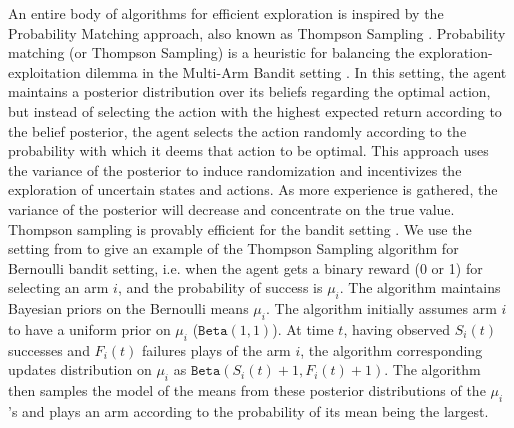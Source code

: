 \label{sec:thompson}
An entire body of algorithms for efficient exploration is inspired by the Probability Matching approach, also known as Thompson Sampling .
Probability matching (or Thompson Sampling)  is a heuristic for balancing the  exploration-exploitation dilemma in the Multi-Arm Bandit setting . In this setting, the agent maintains a posterior distribution over its beliefs regarding the optimal action, but instead of selecting the action with the highest expected return according to the belief posterior, the agent selects the action randomly according to the probability with which it deems that action to be optimal. This approach uses the variance of the posterior to induce randomization and incentivizes the exploration of uncertain states and actions. As more experience is gathered, the variance of the posterior will decrease and concentrate on the true value. Thompson sampling is provably efficient for the bandit setting .
We use the setting from  to give an example of the Thompson Sampling algorithm for Bernoulli bandit setting, i.e. when the agent gets a binary reward (0 or 1) for selecting an arm $i$, and the probability of success is $\mu_i$. The algorithm maintains Bayesian priors on the Bernoulli means $\mu_i$. The algorithm initially assumes arm $i$ to have a uniform prior on $\mu_i$ ($\texttt{Beta}(1,1)$). At time $t$, having observed $S_i(t)$ successes and $F_i(t)$ failures plays of the arm $i$, the algorithm corresponding updates distribution on $\mu_i$ as $ \texttt{Beta}(S_i(t) + 1, F_i(t) + 1)$. The algorithm then samples the model of the means from these posterior distributions of the $\mu_i$'s and plays an arm according to the probability of its mean being the largest.

